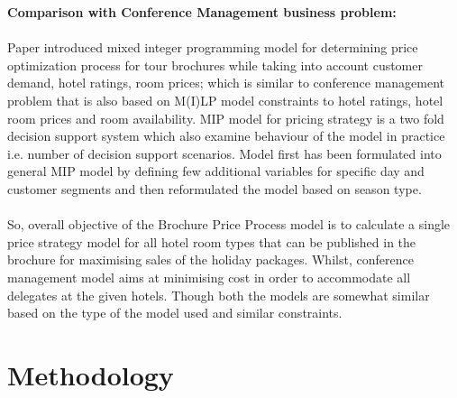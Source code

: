 \documentclass[paper=a4, fontsize=11pt]{scrartcl} %
\begin{document}
\textbf{Comparison with Conference Management business problem: }\\ \\
Paper introduced mixed integer programming model for determining price optimization process for tour brochures while taking into account customer demand, hotel ratings, room prices; which is similar to conference management problem that is also based on M(I)LP model constraints to hotel ratings, hotel room prices and room availability. MIP model for pricing strategy is a two fold decision support system which also examine behaviour of the model in practice i.e. number of decision support scenarios. Model first has been formulated into general MIP model by defining few additional variables for specific day and customer segments and then reformulated the model based on season type. \\ \\
So, overall objective of the Brochure Price Process model is to calculate a single price strategy model for all hotel room types that can be published in the brochure for maximising sales of the holiday packages. Whilst, conference management model aims at minimising cost in order to accommodate all delegates at the given hotels. Though both the models are somewhat similar based on the type of the model used and similar constraints.

\section{Methodology}
\end{document}
